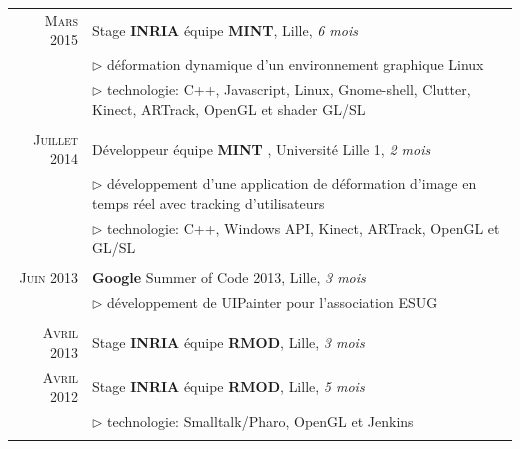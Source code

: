 \documentclass[9pt]{article}
\begin{document}
\begin{tabular}{rl}
	\textsc{Mars} 2015& Stage \textbf{INRIA} équipe \textbf{MINT}, {\small Lille, \textit{6 mois}}\\
        &{$\rhd$ \small  déformation dynamique d'un environnement graphique Linux}\\
        &{$\rhd$ \small technologie: C++, Javascript, Linux, Gnome-shell, Clutter, Kinect, ARTrack, OpenGL et shader GL/SL}\\ &\\
       
	\textsc{Juillet} 2014& Développeur équipe \textbf{MINT} , {\small Université Lille 1, \textit{2 mois}}\\
        &{$\rhd$ \small développement d'une application de déformation d'image en temps réel avec tracking d'utilisateurs}\\
        &{$\rhd$ \small technologie: C++, Windows API, Kinect, ARTrack, OpenGL et GL/SL}\\ &\\
        
	\textsc{Juin} 2013& \textbf{Google} Summer of Code 2013, {\small Lille, \textit{3 mois}}\\
        &{$\rhd$ \small développement de UIPainter pour l'association ESUG}\\ &\\
        
	\textsc{Avril} 2013& Stage \textbf{INRIA} équipe \textbf{RMOD}, {\small Lille, \textit{3 mois}}\\
	\textsc{Avril} 2012& Stage \textbf{INRIA} équipe \textbf{RMOD}, {\small Lille, \textit{5 mois}}\\
        &{$\rhd$ \small technologie: Smalltalk/Pharo, OpenGL et Jenkins}\\ &\\
        
\end{tabular}\\[10pt]

\vspace{-0.7cm}

%
%
\end{document}
